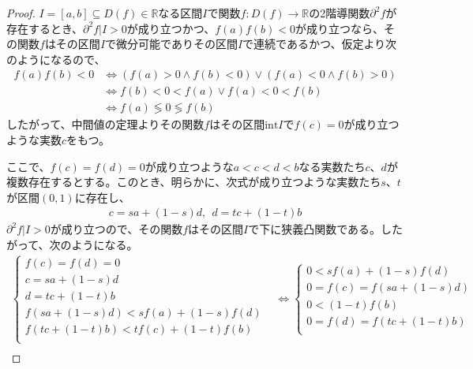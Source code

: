 \documentclass[dvipdfmx]{jsarticle}
\begin{document}
\begin{proof}
$I = [ a,b] \subseteq D(f) \in \mathbb{R}$なる区間$I$で関数$f:D(f) \rightarrow \mathbb{R}$の2階導関数$\partial^{2}f$が存在するとき、$\partial^{2}f|I > 0$が成り立つかつ、$f(a)f(b) < 0$が成り立つなら、その関数$f$はその区間$I$で微分可能でありその区間$I$で連続であるかつ、仮定より次のようになるので、
\begin{align*}
f(a)f(b) < 0 &\Leftrightarrow \left( f(a) > 0 \land f(b) < 0 \right) \vee \left( f(a) < 0 \land f(b) > 0 \right)\\
&\Leftrightarrow f(b) < 0 < f(a) \vee f(a) < 0 < f(b)\\
&\Leftrightarrow f(a) \lessgtr 0 \lessgtr f(b)
\end{align*}
したがって、中間値の定理よりその関数$f$はその区間$\mathrm{int}I$で$f(c) = 0$が成り立つような実数$c$をもつ。\par
ここで、$f\left( c \right) = f\left( d \right) = 0$が成り立つような$a < c < d < b$なる実数たち$c$、$d$が複数存在するとする。このとき、明らかに、次式が成り立つような実数たち$s$、$t$が区間$(0,1)$に存在し、
\begin{align*}
c = sa + \left( 1 - s \right)d,\ \ d = tc + \left( 1 - t \right)b
\end{align*}
$\partial^{2}f|I > 0$が成り立つので、その関数$f$はその区間$I$で下に狭義凸関数である。したがって、次のようになる。
\begin{align*}
\left\{ \begin{matrix}
f\left( c \right) = f\left( d \right) = 0 \\
c = sa + \left( 1 - s \right)d \\
d = tc + \left( 1 - t \right)b \\
f\left( sa + \left( 1 - s \right)d \right) < sf(a) + \left( 1 - s \right)f\left( d \right) \\
f\left( tc + \left( 1 - t \right)b \right) < tf\left( c \right) + \left( 1 - t \right)f(b) \\
\end{matrix} \right. &\Leftrightarrow \left\{ \begin{matrix}
0 < sf(a) + \left( 1 - s \right)f\left( d \right) \\
0 = f\left( c \right) = f\left( sa + \left( 1 - s \right)d \right) \\
0 < \left( 1 - t \right)f(b) \\
0 = f\left( d \right) = f\left( tc + \left( 1 - t \right)b \right) \\
\end{matrix} \right.\\

\end{align*}
\end{proof}
\end{document}
